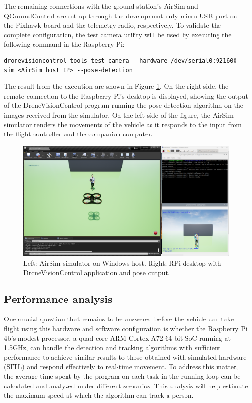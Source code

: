 The remaining connections with the ground station's AirSim and QGroundControl are set up through the development-only micro-USB port on the Pixhawk board and the telemetry radio, respectively. To validate the complete configuration, the test camera utility will be used by executing the following command in the Raspberry Pi:

\begin{verbatim}
dronevisioncontrol tools test-camera --hardware /dev/serial0:921600 --sim <AirSim host IP> --pose-detection
\end{verbatim}

The result from the execution are shown in Figure \ref{fig:rpi-airsim-test}. On the right side, the remote connection to the Raspberry Pi's desktop is displayed, showing the output of the DroneVisionControl program running the pose detection algorithm on the images received from the simulator. On the left side of the figure, the AirSim simulator renders the movements of the vehicle as it responds to the input from the flight controller and the companion computer.

\begin{figure}
  \centering
  \includegraphics[width=\textwidth, keepaspectratio]{img/airsim-rpi-test.png}
  \caption{Left: AirSim simulator on Windows host. Right: RPi desktop with DroneVisionControl application and pose output.}
  \label{fig:rpi-airsim-test}
\end{figure}




\subsection{Performance analysis}
\label{subsec:performance}

One crucial question that remains to be answered before the vehicle can take flight using this hardware and software configuration is whether the Raspberry Pi 4b's modest processor, a quad-core ARM Cortex-A72 64-bit SoC running at 1.5GHz, can handle the detection and tracking algorithms with sufficient performance to achieve similar results to those obtained with simulated hardware (SITL) and respond effectively to real-time movement. To address this matter, the average time spent by the program on each task in the running loop can be calculated and analyzed under different scenarios. This analysis will help estimate the maximum speed at which the algorithm can track a person.

